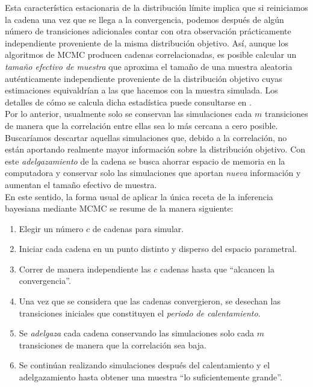 Esta característica estacionaria de la distribución límite implica que si reiniciamos la cadena una vez que se llega a la convergencia, podemos después de algún número de transiciones adicionales contar con otra observación prácticamente independiente proveniente de la misma distribución objetivo. Así, aunque los algoritmos de MCMC producen cadenas correlacionadas, es posible calcular un \textit{tamaño efectivo de muestra} que aproxima el tamaño de una muestra aleatoria auténticamente independiente proveniente de la distribución objetivo cuyas estimaciones equivaldrían a las que hacemos con la muestra simulada. Los detalles de cómo se calcula dicha estadística puede consultarse en \textcite{Gelman13}.\\ 

Por lo anterior, usualmente solo se conservan las simulaciones cada $m$ transiciones de manera que la correlación entre ellas sea lo más cercana a cero posible. Buscaríamos descartar aquellas simulaciones que, debido a la correlación, no están aportando realmente mayor información sobre la distribución objetivo. Con este \textit{adelgazamiento} de la cadena se busca ahorrar espacio de memoria en la computadora y conservar solo las simulaciones que aportan \textit{nueva} información y aumentan el tamaño efectivo de muestra.\\ 

En este sentido, la forma usual de aplicar la única receta de la inferencia bayesiana mediante MCMC se resume de la manera siguiente: 

\begin{enumerate}
\item Elegir un número $c$ de cadenas para simular.
\item Iniciar cada cadena en un punto distinto y disperso del espacio parametral. 
\item Correr de manera independiente las $c$ cadenas hasta que ``alcancen la convergencia''. 
\item Una vez que se considera que las cadenas convergieron, se desechan las transiciones iniciales que constituyen el \textit{periodo de calentamiento}. 
\item Se \textit{adelgaza} cada cadena conservando las simulaciones solo cada $m$ transiciones de manera que la correlación sea baja. 
\item Se continúan realizando simulaciones después del calentamiento y el adelgazamiento hasta obtener una muestra ``lo suficientemente grande''.  
\end{enumerate}

